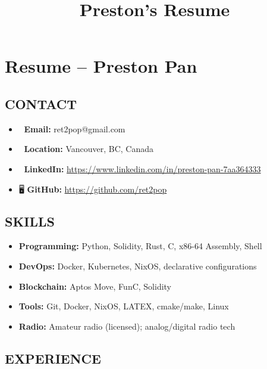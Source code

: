 \documentclass[10pt,letterpaper]{article}
\date{}
\title{Preston's Resume}
\begin{document}
\section*{Resume -- Preston Pan}
\label{sec:org2a32c6c}
\begin{minipage}[t]{0.47\textwidth}
\subsection*{CONTACT}
\label{sec:org846763a}
\begin{itemize}
\item 📧 \textbf{\textbf{Email:}} ret2pop@gmail.com
\item 📍 \textbf{\textbf{Location:}} Vancouver, BC, Canada
\item 🔗 \textbf{\textbf{LinkedIn:}} \href{https://www.linkedin.com/in/preston-pan-7aa364333}{https://www.linkedin.com/in/preston-pan-7aa364333}
\item 🖥️ \textbf{\textbf{GitHub:}} \href{https://github.com/ret2pop}{https://github.com/ret2pop}
\end{itemize}
\subsection*{SKILLS}
\label{sec:orgdecc8d6}
\begin{itemize}
\item \textbf{\textbf{Programming:}} Python, Solidity, Rust, C, x86-64 Assembly, Shell
\item \textbf{\textbf{DevOps:}} Docker, Kubernetes, NixOS, declarative configurations
\item \textbf{\textbf{Blockchain:}} Aptos Move, FunC, Solidity
\item \textbf{\textbf{Tools:}} Git, Docker, NixOS, LATEX, cmake/make, Linux
\item \textbf{\textbf{Radio:}} Amateur radio (licensed); analog/digital radio tech
\end{itemize}

\vfill
\subsection*{EXPERIENCE}
\label{sec:orge5307a0}

\end{minipage}
\end{document}
